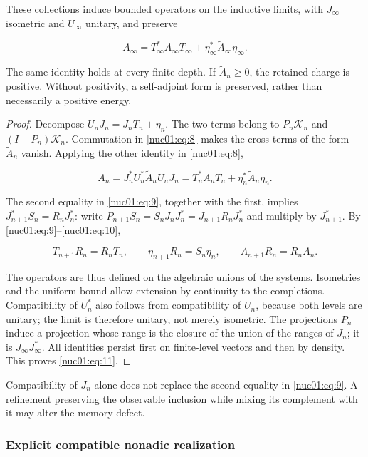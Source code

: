 \begin{theorem}
These collections induce bounded operators on the inductive limits, with \(J_\infty\) isometric and \(U_\infty\) unitary, and preserve

\begin{equation}
A_\infty
=T_\infty^*A_\infty T_\infty
 +\eta_\infty^*\widetilde A_\infty\eta_\infty.
\label{nuc01:eq:11}
\end{equation}

The same identity holds at every finite depth. If \(\widetilde A_n\geq0\), the retained charge is positive. Without positivity, a self-adjoint form is preserved, rather than necessarily a positive energy.
\end{theorem}

\begin{proof}
Decompose \(U_nJ_n=J_nT_n+\eta_n\). The two terms belong to \(P_n\mathscr K_n\) and \((I-P_n)\mathscr K_n\). Commutation in \eqref{nuc01:eq:8} makes the cross terms of the form \(\widetilde A_n\) vanish. Applying the other identity in \eqref{nuc01:eq:8},

\[
A_n=J_n^*U_n^*\widetilde A_nU_nJ_n
=T_n^*A_nT_n+\eta_n^*\widetilde A_n\eta_n.
\]

The second equality in \eqref{nuc01:eq:9}, together with the first, implies
\(J_{n+1}^*S_n=R_nJ_n^*\): write
\(P_{n+1}S_n=S_nJ_nJ_n^*=J_{n+1}R_nJ_n^*\) and multiply by \(J_{n+1}^*\).
By \eqref{nuc01:eq:9}–\eqref{nuc01:eq:10},

\[
T_{n+1}R_n=R_nT_n,\qquad
\eta_{n+1}R_n=S_n\eta_n,\qquad
A_{n+1}R_n=R_nA_n.
\]

The operators are thus defined on the algebraic unions of the systems. Isometries and the uniform bound allow extension by continuity to the completions. Compatibility of \(U_n^*\) also follows from compatibility of \(U_n\), because both levels are unitary; the limit is therefore unitary, not merely isometric. The projections \(P_n\) induce a projection whose range is the closure of the union of the ranges of \(J_n\); it is \(J_\infty J_\infty^*\). All identities persist first on finite-level vectors and then by density. This proves \eqref{nuc01:eq:11}.
\end{proof}

Compatibility of \(J_n\) alone does not replace the second equality in \eqref{nuc01:eq:9}. A refinement preserving the observable inclusion while mixing its complement with it may alter the memory defect.

\subsubsection{Explicit compatible nonadic realization}

